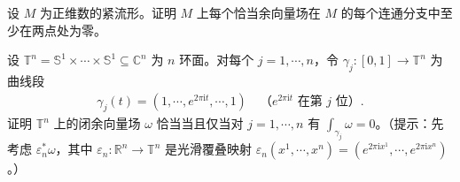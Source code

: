 \documentclass[../../main.tex]{subfiles}
\begin{document}
\begin{exercise}\label{exercise:ch11-16}
设 $M$ 为正维数的紧流形。证明 $M$ 上每个恰当余向量场在 $M$ 的每个连通分支中至少在两点处为零。
\end{exercise}

\begin{exercise}\label{exercise:ch11-17}
设 $\mathbb{T}^n=\mathbb{S}^1\times\cdots\times\mathbb{S}^1\subseteq\mathbb{C}^n$ 为 $n$ 环面。对每个 $j=1,\cdots ,n$，令 $\gamma_j\colon[0,1]\to\mathbb{T}^n$ 为曲线段
\begin{align*}
\gamma_j(t)=(1,\cdots ,e^{2\pi\mathrm{i}t},\cdots ,1)\quad\text{（$e^{2\pi\mathrm{i}t}$ 在第 $j$ 位）}.
\end{align*}
证明 $\mathbb{T}^n$ 上的闭余向量场 $\omega$ 恰当当且仅当对 $j=1,\cdots ,n$ 有 $\int_{\gamma_j}\omega=0$。（提示：先考虑 $\varepsilon_n^*\omega$，其中 $\varepsilon_n\colon\mathbb{R}^n\to\mathbb{T}^n$ 是光滑覆叠映射 $\varepsilon_n(x^1,\cdots ,x^n)=(e^{2\pi\mathrm{i}x^1},\cdots ,e^{2\pi\mathrm{i}x^n})$。）
\end{exercise}
\end{document}
